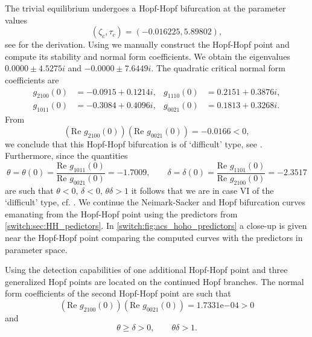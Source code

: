 The trivial equilibrium undergoes a Hopf-Hopf bifurcation at the parameter values
\begin{equation}
(\zeta_{c},\tau_{c})=(-0.016225,5.89802),
\label{switch:eq:acs-HH-pm}
\end{equation}
see \cite{Ding@2016} for the derivation. Using \DDEBIFTOOL we manually construct the Hopf-Hopf point and compute its stability and normal form coefficients. We obtain the eigenvalues $0.0000\pm4.5275i$ and $-0.0000\pm7.6449i$. The quadratic critical normal form coefficients are
\begin{align*}
g_{2100}(0) & =-0.0915+0.1214i, & g_{1110}(0) & =0.2151+0.3876i,\\
g_{1011}(0) & =-0.3084+0.4096i, & g_{0021}(0) & =0.1813+0.3268i.
\end{align*}
From
\[
(\text{Re }g_{2100}(0))(\text{Re }g_{0021}(0))=-0.0166<0,
\]
we conclude that this Hopf-Hopf bifurcation is of `difficult' type, see \cite[page 361]{Kuznetsov2004}. Furthermore, since the quantities
\[
\theta=\theta(0)=\frac{\text{Re }g_{1011}(0)}{\text{Re }g_{0021}(0)}=-1.7009,\qquad\delta=\delta(0)=\frac{\text{Re }g_{1101}(0)}{\text{Re }g_{2100}(0)}=-2.3517
\]
are such that $\theta<0,\,\delta<0,\,\theta\delta>1$ it follows that we are in case VI of the `difficult' type, cf. \cite[page 365]{Kuznetsov2004}.
We continue the Neimark-Sacker and Hopf bifurcation curves emanating from the Hopf-Hopf point using the predictors from \cref{switch:sec:HH_pedictors}. In  \cref{switch:fig:acs_hoho_predictors} a close-up is given near the Hopf-Hopf point comparing the computed curves with the predictors in parameter space.
 
Using the detection capabilities of \DDEBIFTOOL one additional Hopf-Hopf point and three generalized Hopf points are located on the continued Hopf branches. The normal form coefficients of the second Hopf-Hopf point are such that
\[
(\text{Re }g_{2100}(0))(\text{Re }g_{0021}(0))=1.7331\mathrm{e}{-04}>0
\]
and
\[
\theta\geq\delta>0,\qquad \theta\delta>1.
\]

